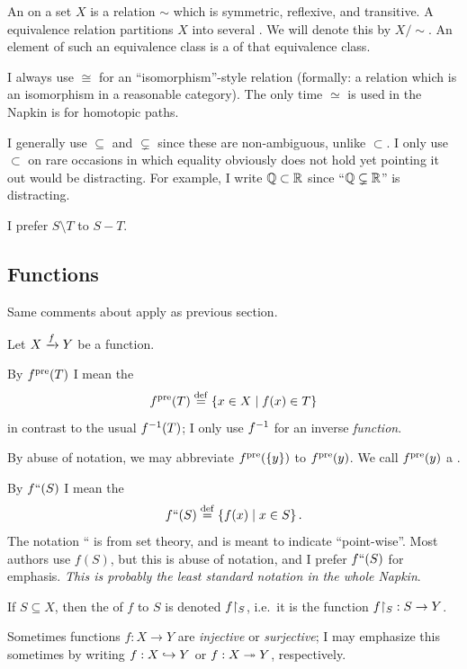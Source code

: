 An  on a set $X$ is a relation $\sim$
which is symmetric, reflexive, and transitive.
A equivalence relation partitions $X$ into several .
We will denote this by $X / {\sim}$.
An element of such an equivalence class is a  of that equivalence class.

I always use $\cong$ for an ``isomorphism''-style relation
(formally: a relation which is an isomorphism in a reasonable category).
The only time $\simeq$ is used in the Napkin is for homotopic paths.

I generally use $\subseteq$ and $\subsetneq$ since these are non-ambiguous,
unlike $\subset$.  I only use $\subset$ on rare occasions in which equality
obviously does not hold yet pointing it out would be distracting.
For example, I write $\mathbb Q \subset \mathbb R$
since ``$\mathbb Q \subsetneq \mathbb R$'' is distracting.

I prefer $S \setminus T$ to $S - T$.

\subsection*{Functions}
Same comments about  apply as previous section.

Let $X \xrightarrow{f} Y$ be a function.

\begin{itemize}
\ii By $f^{\text{pre}}(T)$ I mean the 
\[ f^{\text{pre}}(T) \overset{\mathrm{def}}{=} \left\{ x \in X \mid f(x) \in T \right\} \]
in contrast to the usual $f^{-1}(T)$; I only use $f^{-1}$ for an inverse \emph{function}.

By abuse of notation, we may abbreviate $f^{\text{pre}}(\{y\})$ to $f^{\text{pre}}(y)$.
We call $f^{\text{pre}}(y)$ a .

\ii By $f``(S)$ I mean the 
\[ f``(S) \overset{\mathrm{def}}{=} \left\{ f(x) \mid x \in S \right\}. \]
The notation {``} is from set theory, and is meant to indicate ``point-wise''.
Most authors use $f(S)$, but this is abuse of notation,
and I prefer $f``(S)$ for emphasis.
\emph{This is probably the least standard notation in the whole Napkin}.

\ii If $S \subseteq X$, then the  of $f$ to $S$
is denoted $f \restrict{S}$,
i.e.\ it is the function $f \restrict{S} : S \to Y$.

\ii Sometimes functions $f : X \to Y$ are \emph{injective} or \emph{surjective};
I may emphasize this sometimes by writing $f : X \hookrightarrow Y$ or $f : X \twoheadrightarrow Y$, respectively.
\end{itemize}

